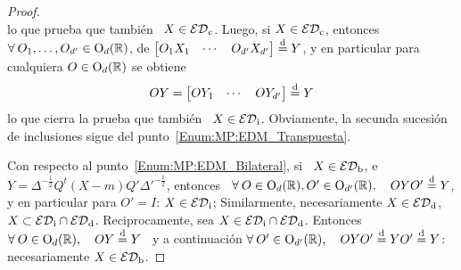 \begin{proof}
\[  \]
  lo que prueba  que tambi\'en \ $X \in \mathcal{ED}_{\mathrm{c}}$.  Luego,  si $X \in \mathcal{ED}_{\mathrm{c}}$,
  entonces  \  $\forall  \:  O_1  ,  \ldots  ,  O_{d'}  \in  \mathrm{O}_d(\mathbb{R})$,  de
  $\begin{bmatrix} O_1 X_1  & \cdots & O_{d'} X_{d'}  \end{bmatrix} \stackrel{\mathrm{d}}{=} Y$, y
  en particular para cualquiera $O \in \mathrm{O}_d(\mathbb{R})$ se obtiene
  \[
  O Y = \begin{bmatrix} O Y_1 & \cdots & O Y_{d'} \end{bmatrix} \stackrel{\mathrm{d}}{=} Y
  \]
  lo que  cierra la  prueba que  tambi\'en \ $X  \in \mathcal{ED}_{\mathrm{i}}$.   Obviamente, la
  secunda        sucesi\'on        de        inclusiones        sigue        del
  punto~\ref{Enum:MP:EDM_Transpuesta}.


  Con respecto al punto~\ref{Enum:MP:EDM_Bilateral}, si  \ $X \in \mathcal{ED}_{\mathrm{b}}$, e \
  $Y =  \Delta^{-\frac12} Q^t (X-m) Q' \Delta'^{-\frac12}$,  entonces \ $\forall
  \: O \in \mathrm{O}_d(\mathbb{R}), O' \in \mathrm{O}_{d'}(\mathbb{R}),  \quad O Y O' \stackrel{\mathrm{d}}{=} Y$, y en
  particular para  $O' = I$:  $X \in \mathcal{ED}_{\mathrm{i}}$; Similarmente,  necesariamente $X
  \in \mathcal{ED}_{\mathrm{d}}$, \ie $X \subset \mathcal{ED}_{\mathrm{i}} \cap \mathcal{ED}_{\mathrm{d}}$.  Reciprocamente, sea $X
  \in \mathcal{ED}_{\mathrm{i}} \cap \mathcal{ED}_{\mathrm{d}}$.  Entonces  $\forall \: O \in \mathrm{O}_d(\mathbb{R}), \quad
  O Y \stackrel{\mathrm{d}}{=} Y$ \ y  a continuaci\'on $\forall \: O' \in \mathrm{O}_{d'}(\mathbb{R}), \quad
  O Y O' \stackrel{\mathrm{d}}{=} Y O' \stackrel{\mathrm{d}}{=} Y$: necesariamente $X \in \mathcal{ED}_{\mathrm{b}}$.


\end{proof}
